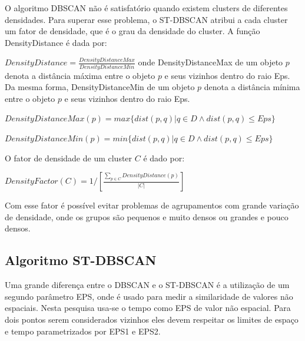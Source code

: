 O algoritmo DBSCAN não é satisfatório quando existem clusters de diferentes densidades. Para superar esse problema,  o ST-DBSCAN atribui a cada cluster um fator de densidade, que é o grau da densidade do cluster.
A função DensityDistance é dada por:

${DensityDistance = \frac{DensityDistanceMax}{DensityDistanceMin}}$
\linebreak
onde DensityDistanceMax de um objeto ${p}$ denota a distância máxima entre o objeto ${p}$ e seus vizinhos dentro do raio Eps. Da mesma forma, DensityDistanceMin de um objeto ${p}$ denota a distância mínima entre o objeto ${p}$ e seus vizinhos dentro do raio Eps.

${DensityDistanceMax(p) = max\big\{ dist(p, q) | q \in D \wedge dist(p, q)  \leqslant Eps\big\} }$

${DensityDistanceMin(p) = min\big\{ dist(p, q) | q \in D \wedge dist(p, q)  \leqslant Eps\big\} }$
\linebreak

O fator de densidade de um cluster ${C}$ é dado por:

${DensityFactor(C) = 1\big/\left [   \frac{\sum_{p\in C}DensityDistance(p)}{|C|} \right ]
}$
\linebreak

Com esse fator é possível evitar problemas de agrupamentos com grande variação de densidade, onde os grupos são pequenos e muito densos ou grandes e pouco densos.

\subsection{Algoritmo ST-DBSCAN}
Uma grande diferença entre o DBSCAN e o ST-DBSCAN é a utilização de um segundo parâmetro EPS, onde é usado para medir a similaridade de valores não espaciais. Nesta pesquisa usa-se o tempo como EPS de valor não espacial. Para dois pontos serem considerados vizinhos eles devem respeitar os limites de espaço e tempo parametrizados por EPS1 e EPS2.

